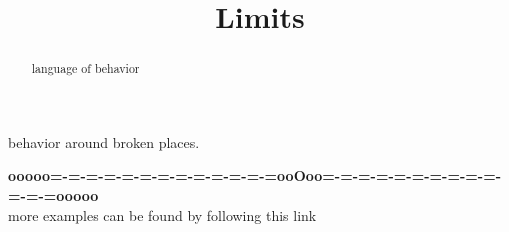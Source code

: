 \documentclass{ximera}
\title{Limits}
\begin{document}
\begin{abstract}
language of behavior
\end{abstract}
\maketitle





behavior around broken places.




















\begin{center}
\textbf{\textcolor{green!50!black}{ooooo=-=-=-=-=-=-=-=-=-=-=-=-=ooOoo=-=-=-=-=-=-=-=-=-=-=-=-=ooooo}} \\

more examples can be found by following this link\\ 

\end{center}
\end{document}
